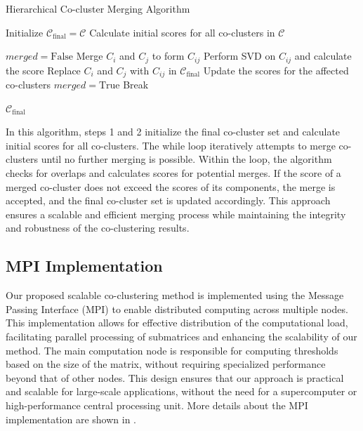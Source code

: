 \documentclass[journal]{IEEEtran}
\begin{document}
\begin{algorithm}[!t]
  \caption{Hierarchical Co-cluster Merging Algorithm}\label{alg:hierarchical_merging}
  \begin{algorithmic}[1]
    
    \STATE Initialize $\mathcal{C}_{\text{final}} = \mathcal{C}$
    \STATE Calculate initial scores for all co-clusters in $\mathcal{C}$
    
      \STATE $merged = \text{False}$
          \STATE Merge $C_i$ and $C_j$ to form $C_{ij}$
          \STATE Perform SVD on $C_{ij}$ and calculate the score
            \STATE Replace $C_i$ and $C_j$ with $C_{ij}$ in $\mathcal{C}_{\text{final}}$
            \STATE Update the scores for the affected co-clusters
            \STATE $merged = \text{True}$
          \ENDIF
        \ENDIF
      \ENDFOR
        \STATE Break
      \ENDIF
    \ENDWHILE
    
    \RETURN $\mathcal{C}_{\text{final}}$
  \end{algorithmic}
\end{algorithm}

In this algorithm, steps 1 and 2 initialize the final co-cluster set and calculate initial scores for all co-clusters. The while loop iteratively attempts to merge co-clusters until no further merging is possible. Within the loop, the algorithm checks for overlaps and calculates scores for potential merges. If the score of a merged co-cluster does not exceed the scores of its components, the merge is accepted, and the final co-cluster set is updated accordingly. This approach ensures a scalable and efficient merging process while maintaining the integrity and robustness of the co-clustering results.

\subsection{MPI Implementation}

Our proposed scalable co-clustering method is implemented using the Message Passing Interface (MPI) to enable distributed computing across multiple nodes. This implementation allows for effective distribution of the computational load, facilitating parallel processing of submatrices and enhancing the scalability of our method. The main computation node is responsible for computing thresholds based on the size of the matrix, without requiring specialized performance beyond that of other nodes. This design ensures that our approach is practical and scalable for large-scale applications, without the need for a supercomputer or high-performance central processing unit.
More details about the MPI implementation are shown in .
\end{document}
